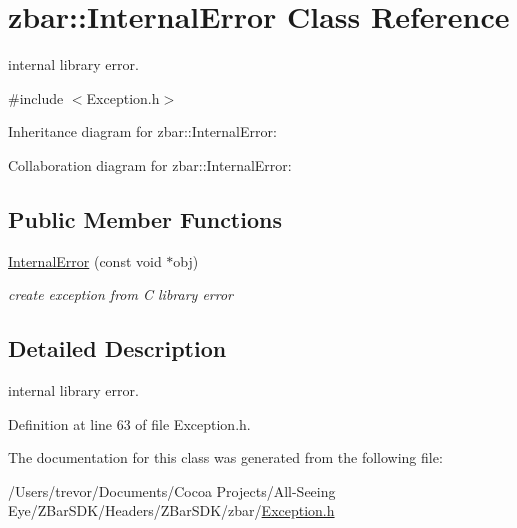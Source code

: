 \hypertarget{classzbar_1_1_internal_error}{
\section{zbar::InternalError Class Reference}
\label{classzbar_1_1_internal_error}
}


internal library error.  




{\ttfamily \#include $<$Exception.h$>$}



Inheritance diagram for zbar::InternalError:


Collaboration diagram for zbar::InternalError:
\subsection*{Public Member Functions}
\begin{DoxyCompactItemize}
\item 
\hypertarget{classzbar_1_1_internal_error_a360183b4c308237c39a7966fde883196}{
\hyperlink{classzbar_1_1_internal_error_a360183b4c308237c39a7966fde883196}{InternalError} (const void $\ast$obj)}
\label{classzbar_1_1_internal_error_a360183b4c308237c39a7966fde883196}

\begin{DoxyCompactList}\small\item\em create exception from C library error \end{DoxyCompactList}\end{DoxyCompactItemize}


\subsection{Detailed Description}
internal library error. 

Definition at line 63 of file Exception.h.



The documentation for this class was generated from the following file:\begin{DoxyCompactItemize}
\item 
/Users/trevor/Documents/Cocoa Projects/All-\/Seeing Eye/ZBarSDK/Headers/ZBarSDK/zbar/\hyperlink{_exception_8h}{Exception.h}\end{DoxyCompactItemize}
